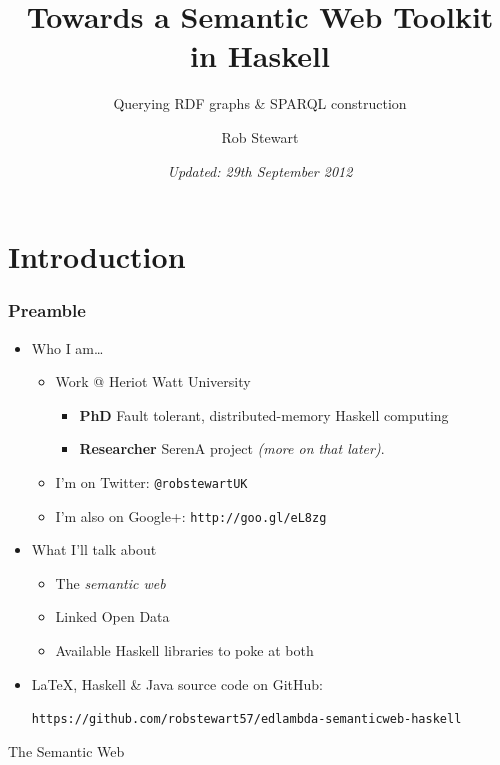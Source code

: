 \documentclass{beamer}
\author{Rob Stewart}
\institute{Heriot Watt University}
\title{Towards a Semantic Web Toolkit in Haskell}
\date{\emph{Updated: 29th September 2012}}
\subtitle{Querying RDF graphs \& SPARQL construction}
\begin{document}
\section{Introduction}

\maketitle

\begin{frame}[fragile]
\frametitle{Preamble}

\begin{itemize}
\item Who I am\ldots
  
  \begin{itemize}
  \item Work @ Heriot Watt University
    
    \begin{itemize}
    \item \textbf{PhD} Fault tolerant, distributed-memory Haskell computing
    \item \textbf{Researcher} SerenA project \emph{(more on that later)}.
    \end{itemize}
    
  \item I'm on Twitter: \texttt{@robstewartUK}
  \item I'm also on Google+: \texttt{http://goo.gl/eL8zg}
    
  \end{itemize}
  
\bigskip
\item What I'll talk about
  
  \begin{itemize}
  \item The \emph{semantic web}
  \item Linked Open Data
  \item Available Haskell libraries to poke at both
  \end{itemize}

\bigskip
\item LaTeX, Haskell \& Java source code on GitHub:

\small
\texttt{https://github.com/robstewart57/edlambda-semanticweb-haskell}
  
\end{itemize}

\end{frame}


\begin{frame}

\huge
\begin{center}
The Semantic Web
\end{center}

\end{frame}
\end{document}
